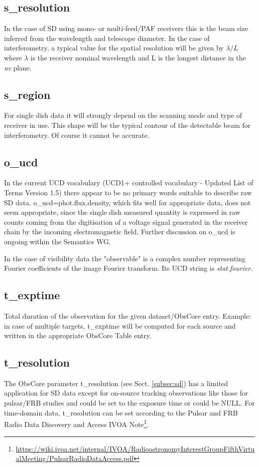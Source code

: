\documentclass[11pt,a4paper]{ivoa}
\begin{document}
\subsection{s\_resolution}
\label{sec:res}
In the case of SD using mono- or multi-feed/PAF receivers this is the beam size inferred from the wavelength and telescope diameter.
In the case of interferometry, a typical value for the spatial resolution will be given by $\lambda / L$ where $\lambda$
is the %
receiver nominal wavelength and L is the longest distance in the \emph{uv} plane.


\subsection{s\_region}
For single dish data it will strongly depend on the scanning mode and type of receiver in use.
This shape will be the typical contour of the detectable beam for interferometry. Of course it cannot be accurate.

\subsection{o\_ucd}

In the current UCD vocabulary (UCD1+ controlled vocabulary - Updated List of Terms Version 1.5) there appear to be no primary words suitable to describe raw SD data. o\_ucd=phot.flux.density, which fits well for appropriate data, does not seem appropriate, since the single dish measured quantity is expressed in raw counts coming from the digitisation of a voltage signal generated in the receiver chain by the incoming electromagnetic field. Further discussion on o\_ucd is ongoing within the Semantics WG.

In the case of visibility data the "observable" is a complex number representing Fourier
coefficients of the image Fourier transform. Its UCD string is \emph{stat.fourier}.

\subsection{t\_exptime}
Total duration of the observation for the given dataset/ObsCore entry. Example: in case of multiple targets, t\_exptime will be computed for each source and written in the appropriate ObsCore Table entry.


\subsection{t\_resolution}
The ObsCore parameter t\_resolution (see Sect. \ref{subsec:sd}) has a limited application for SD data
except for on-source tracking observations like those for pulsar/FRB studies and could be set to the
exposure time or could be NULL. For time-domain data, t\_resolution can be set according to the Pulsar
and FRB Radio Data Discovery and Access IVOA Note\footnote{\url{https://wiki.ivoa.net/internal/IVOA/RadioastronomyInterestGroupFifthVirtualMeeting/PulsarRadioDataAccess.pdf}}.
\end{document}
